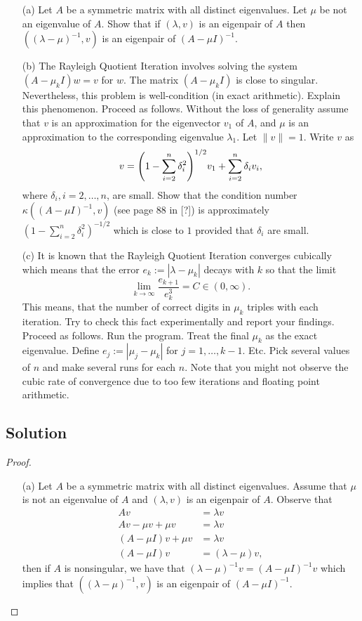 \documentclass[12pt]{report}
\begin{document}
\begin{problem}
\begin{enumerate}
    \item [(a)] Let $A$ be a symmetric matrix with all distinct eigenvalues. Let $\mu$ be not an eigenvalue of $A$. Show that if $(\lambda,v)$ is an eigenpair of $A$ then $((\lambda - \mu)^{-1},v)$ is an eigenpair of $(A - \mu I)^{-1}$.
    \item [(b)] The Rayleigh Quotient Iteration involves solving the system $(A - \mu_k I)w = v$ for $w$. The matrix $(A - \mu_k I)$ is close to singular. Nevertheless, this problem is well-condition (in exact arithmetic). Explain this phenomenon. Proceed as follows. Without the loss of generality assume that $v$ is an approximation for the eigenvector $v_1$ of $A$, and $\mu$ is an approximation to the corresponding eigenvalue $\lambda_1$. Let $\|v\| = 1$. Write $v$ as
    \[
         v = {\left(1 - \sum_{i=2}^n \delta_i^2\right)}^{1/2}v_1 + \sum_{i=2}^n\delta_iv_i,
    \] 
    where $\delta_i, i=2,\dots,n$, are small. Show that the condition number $\kappa((A-\mu I)^{-1},v)$ (see page 88 in [?]) is approximately $(1 - \sum_{i=2}^n \delta_i^2)^{-1/2}$ which is close to $1$ provided that $\delta_i$ are small. 
    \item [(c)] It is known that the Rayleigh Quotient Iteration converges cubically which means that the error $e_k := |\lambda - \mu_k |$ decays with $k$ so that the limit
    \[
         \lim_{k\to\infty}\frac{e_{k+1}}{e^3_k} =C \in (0,\infty).
    \]
    This means, that the number of correct digits in $\mu_k$ triples with each iteration. Try to check this fact experimentally and report your ﬁndings. Proceed as follows. Run the program. Treat the ﬁnal $\mu_k$ as the exact eigenvalue. Deﬁne $e_j := |\mu_j - \mu_k|$ for $j = 1, \dots , k-1$. Etc. Pick several values of $n$ and make several
    runs for each $n$. Note that you might not observe the cubic rate of convergence due to too few iterations and ﬂoating point arithmetic.
    
\end{enumerate}


\subsection*{Solution}
\begin{proof}

\begin{enumerate}
    \item [(a)]
    Let $A$ be a symmetric matrix with all distinct eigenvalues. Assume that $\mu$ is not an eigenvalue of $A$ and $(\lambda,v)$ is an eigenpair of $A$. Observe that
    \begin{align*}
        Av &= \lambda v\\
        Av - \mu v + \mu v &= \lambda v\\
        (A - \mu I)v + \mu v &= \lambda v\\
        (A - \mu I)v &= (\lambda - \mu)v,
    \end{align*}
    then if $A$ is nonsingular, we have that $(\lambda - \mu)^{-1}v = (A - \mu I)^{-1}v$ which implies that $((\lambda - \mu)^{-1},v)$ is an eigenpair of $(A - \mu I)^{-1}$.  


\end{enumerate}
\end{proof}
\end{problem}
\end{document}
